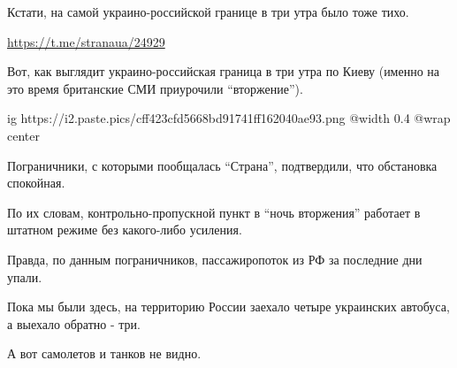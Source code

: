 Кстати, на самой украино-российской границе в три утра было тоже тихо.

\url{https://t.me/stranaua/24929}

Вот, как выглядит украино-российская граница в три утра по Киеву (именно на это
время британские СМИ приурочили \enquote{вторжение}).

\ifcmt
  ig https://i2.paste.pics/cff423cfd5668bd91741ff162040ae93.png
  @width 0.4
	@wrap center
\fi

Пограничники, с которыми пообщалась \enquote{Страна}, подтвердили, что обстановка
спокойная.

По их словам, контрольно-пропускной пункт в \enquote{ночь вторжения} работает в штатном
режиме без какого-либо усиления.

Правда, по данным пограничников, пассажиропоток из РФ за последние дни упали.

Пока мы были здесь, на территорию России заехало четыре украинских автобуса, а
выехало обратно - три.

А вот самолетов и танков не видно.
